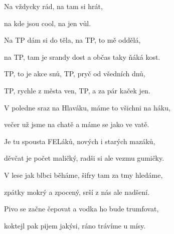 

\zs
Na  vždycky  rád,
na  tam si  hrát,

na  kde jsou  cool,
na  jen  vůl.
\ks

\zs
Na TP dám si do těla,
na TP, to mě oddělá,

na TP, tam je srandy dost
a občas taky ňáká kost.
\ks

\zr
TP, to je akce snů,
TP, pryč od všedních dnů,

TP, rychle z města ven,
TP, a za pár kaček jen.
\kr

\zs
V poledne sraz na Hlaváku,
máme to všichni na háku,

večer už jsme na chatě
a máme se jako ve vatě.
\ks

\zs
Je tu spousta FELáků,
nových i starých mazáků,

děvčat je počet maličký,
radši si ale vezmu gumičky.
\ks

\zr
\kr

\zs
V lese jak blbci běháme,
šifry tam za tmy hledáme,

zpátky mokrý a zpocený,
srší z nás ale nadšení.
\ks

\zs
Pivo se začne čepovat
a vodka ho bude trumfovat,

koktejl pak pijem jakýsi,
ráno trávíme u mísy.
\ks

\zr
\kr

\kp 

